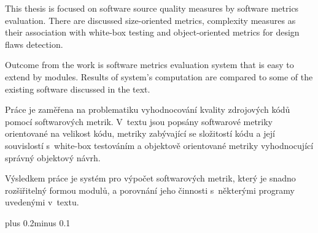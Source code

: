 \documentclass[11pt,twoside,a4paper]{book}
\begin{document}
 
\abstractpage

\noindent
This thesis is focused on software source quality measures by software metrics evaluation. There are discussed size-oriented metrics,
complexity measures as their association with white-box testing and object-oriented metrics for design flaws detection.

\noindent
Outcome from the work is software metrics evaluation system that is easy to extend by modules. Results of system's computation are compared to
some of the existing software discussed in the text.


\baselineskip

\noindent
Práce je zaměřena na problematiku vyhodnocování kvality zdrojových kódů pomocí softwarových metrik. V~textu jsou popsány
softwarové metriky orientované na velikost kódu, metriky zabývající se složitostí kódu a její souvislostí s~white-box testováním
a objektově orientované metriky vyhodnocující správný objektový návrh.

\noindent
Výsledkem práce je systém pro výpočet softwarových metrik, který je snadno rozšiřitelný formou modulů, a porovnání
jeho činnosti s~některými programy uvedenými v~textu.


\tableofcontents



\listoffigures






\mainbodystarts
\normalfont
{}\baselineskip plus 0.2\baselineskip minus 0.1\baselineskip

\end{document}
